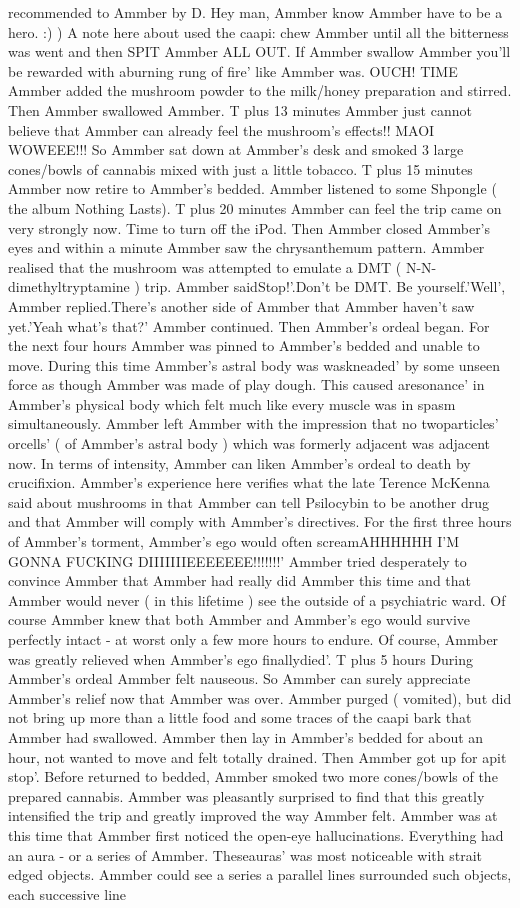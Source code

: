 \documentclass[12pt]{book}
\begin{document}
recommended to Ammber by D. Hey man, Ammber know Ammber have to be a hero. :) ) A note here about used the caapi: chew Ammber until all the bitterness was went and then SPIT Ammber ALL OUT. If Ammber swallow Ammber you'll be rewarded with aburning rung of fire' like Ammber was. OUCH! TIME Ammber added the mushroom powder to the milk/honey preparation and stirred. Then Ammber swallowed Ammber. T plus 13 minutes Ammber just cannot believe that Ammber can already feel the mushroom's effects!! MAOI WOWEEE!!! So Ammber sat down at Ammber's desk and smoked 3 large cones/bowls of cannabis mixed with just a little tobacco. T plus 15 minutes Ammber now retire to Ammber's bedded. Ammber listened to some Shpongle ( the album Nothing Lasts). T plus 20 minutes Ammber can feel the trip came on very strongly now. Time to turn off the iPod. Then Ammber closed Ammber's eyes and within a minute Ammber saw the chrysanthemum pattern. Ammber realised that the mushroom was attempted to emulate a DMT ( N-N-dimethyltryptamine ) trip. Ammber saidStop!'.Don't be DMT. Be yourself.'Well', Ammber replied.There's another side of Ammber that Ammber haven't saw yet.'Yeah what's that?' Ammber continued. Then Ammber's ordeal began. For the next four hours Ammber was pinned to Ammber's bedded and unable to move. During this time Ammber's astral body was waskneaded' by some unseen force as though Ammber was made of play dough. This caused aresonance' in Ammber's physical body which felt much like every muscle was in spasm simultaneously. Ammber left Ammber with the impression that no twoparticles' orcells' ( of Ammber's astral body ) which was formerly adjacent was adjacent now. In terms of intensity, Ammber can liken Ammber's ordeal to death by crucifixion. Ammber's experience here verifies what the late Terence McKenna said about mushrooms in that Ammber can tell Psilocybin to be another drug and that Ammber will comply with Ammber's directives. For the first three hours of Ammber's torment, Ammber's ego would often screamAHHHHHH I'M GONNA FUCKING DIIIIIIIEEEEEEE!!!!!!!' Ammber tried desperately to convince Ammber that Ammber had really did Ammber this time and that Ammber would never ( in this lifetime ) see the outside of a psychiatric ward. Of course Ammber knew that both Ammber and Ammber's ego would survive perfectly intact - at worst only a few more hours to endure. Of course, Ammber was greatly relieved when Ammber's ego finallydied'. T plus 5 hours During Ammber's ordeal Ammber felt nauseous. So Ammber can surely appreciate Ammber's relief now that Ammber was over. Ammber purged ( vomited), but did not bring up more than a little food and some traces of the caapi bark that Ammber had swallowed. Ammber then lay in Ammber's bedded for about an hour, not wanted to move and felt totally drained. Then Ammber got up for apit stop'. Before returned to bedded, Ammber smoked two more cones/bowls of the prepared cannabis. Ammber was pleasantly surprised to find that this greatly intensified the trip and greatly improved the way Ammber felt. Ammber was at this time that Ammber first noticed the open-eye hallucinations. Everything had an aura - or a series of Ammber. Theseauras' was most noticeable with strait edged objects. Ammber could see a series a parallel lines surrounded such objects, each successive line 
\end{document}
